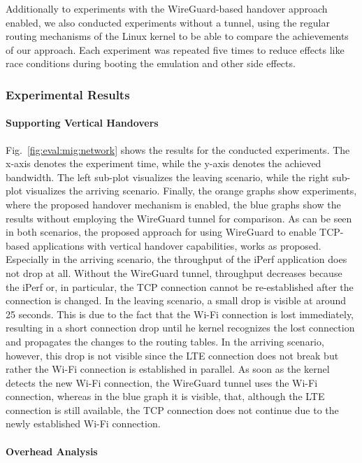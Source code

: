 Additionally to experiments with the WireGuard-based handover approach enabled, we also conducted experiments without a tunnel, using the regular routing mechanisms of the Linux kernel to be able to compare the achievements of our approach.
Each experiment was repeated five times to reduce effects like race conditions during booting the emulation and other side effects.

\subsubsection{Experimental Results}

\paragraph{Supporting Vertical Handovers}

Fig.~\ref{fig:eval:mig:network} shows the results for the conducted experiments.
The x-axis denotes the experiment time, while the y-axis denotes the achieved bandwidth.
The left sub-plot visualizes the leaving scenario, while the right sub-plot visualizes the arriving scenario.
Finally, the orange graphs show experiments, where the proposed handover mechanism is enabled, the blue graphs show the results without employing the WireGuard tunnel for comparison.
As can be seen in both scenarios, the proposed approach for using WireGuard to enable TCP-based applications with vertical handover capabilities, works  as proposed.
Especially in the arriving scenario, the throughput of the iPerf application does not drop at all.
Without the WireGuard tunnel, throughput decreases because the iPerf or, in particular, the TCP connection cannot be re-established after the connection is changed.
In the leaving scenario, a small drop is visible at around 25 seconds.
This is due to the fact that the Wi-Fi connection is lost immediately, resulting in a short connection drop until he kernel recognizes the lost connection and propagates the changes to the routing tables.
In the arriving scenario, however, this drop is not visible since the LTE connection does not break but rather the Wi-Fi connection is established in parallel.
As soon as the kernel detects the new Wi-Fi connection, the WireGuard tunnel uses the Wi-Fi connection, whereas in the blue graph it is visible, that, although the LTE connection is still available, the TCP connection does not continue due to the newly established Wi-Fi connection.

\paragraph{Overhead Analysis}


